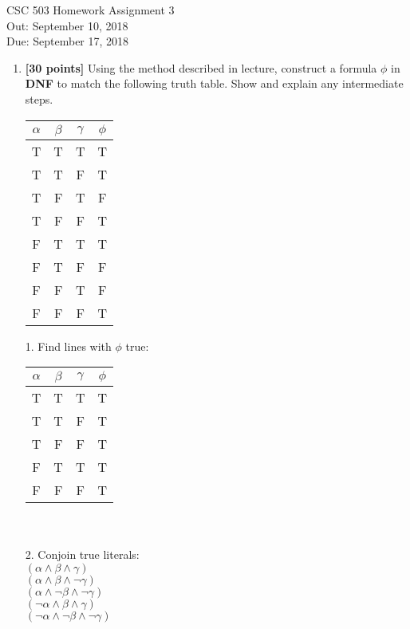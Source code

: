 \documentclass{article}
\begin{document}
\begin{center}
  {\LARGE CSC 503 Homework Assignment 3}\\[1pc]
  Out: September 10, 2018 \\
  Due: September 17, 2018 \\
\end{center}

\begin{enumerate}

\item \textbf{[30 points]} Using the method described in lecture, construct a
  formula $\phi$ in \textbf{DNF} to match the following truth table.
  Show and explain any intermediate steps.
  \begin{center}
    \begin{tabular}{ccc|c}
      $\alpha$ & $\beta$ & $\gamma$ & $\phi$ \\ \hline
      T & T & T & T\\
      T & T & F & T\\
      T & F & T & F\\
      T & F & F & T\\
      F & T & T & T\\
      F & T & F & F\\
      F & F & T & F\\
      F & F & F & T
    \end{tabular}
  \end{center}
  \begin{answer}
    1. Find lines with $\phi$ true:\\
    \begin{tabular}{ccc|c}
      $\alpha$ & $\beta$ & $\gamma$ & $\phi$ \\ \hline
      T & T & T & T\\
      T & T & F & T\\
      T & F & F & T\\
      F & T & T & T\\
      F & F & F & T\\
    \end{tabular}\\ \\
    2. Conjoin true literals:\\
    $(\alpha \land \beta \land \gamma)$\\
    $(\alpha \land \beta \land \neg \gamma)$\\
    $(\alpha \land \neg \beta \land \neg \gamma)$\\
    $(\neg \alpha \land \beta \land \gamma)$\\
    $(\neg \alpha \land \neg \beta \land \neg \gamma)$


\end{answer}
\end{enumerate}
\end{document}
